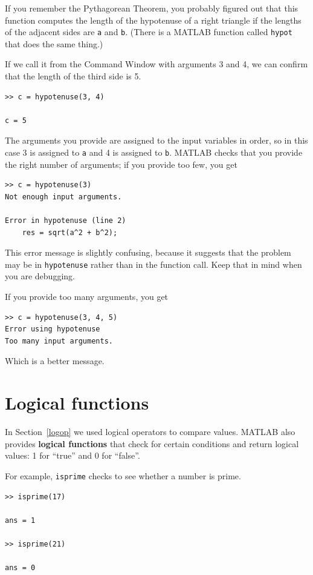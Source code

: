 \documentclass{book}
\begin{document}
If you remember the Pythagorean Theorem, you probably figured out
that this function computes the length of the hypotenuse of a right
triangle if the lengths of the adjacent sides are {\tt a}
and {\tt b}.  (There is a MATLAB function called {\tt hypot} that does
the same thing.)

If we call it from the Command Window with arguments 3 and 4, we can
confirm that the length of the third side is 5.

\begin{verbatim}
>> c = hypotenuse(3, 4)

c = 5
\end{verbatim}

The arguments you provide are assigned to the input variables in
order, so in this case 3 is assigned to {\tt a} and 4 is assigned to
{\tt b}.  MATLAB checks that you provide the right number of arguments;
if you provide too few, you get

\begin{verbatim}
>> c = hypotenuse(3)
Not enough input arguments.

Error in hypotenuse (line 2)
    res = sqrt(a^2 + b^2);
\end{verbatim}

This error message is slightly confusing, because it suggests that
the problem may be in {\tt hypotenuse} rather than in the function call.
Keep that in mind when you are debugging.

If you provide too many arguments, you get

\begin{verbatim}
>> c = hypotenuse(3, 4, 5)
Error using hypotenuse
Too many input arguments.
\end{verbatim}

Which is a better message.


\section{Logical functions}

In Section~\ref{logop} we used logical operators to compare values.
MATLAB also provides {\bf logical functions} that check for certain
conditions and return logical values: 1 for ``true'' and 0 for ``false''.

For example, {\tt isprime} checks to see whether a number is prime.

\begin{verbatim}
>> isprime(17)

ans = 1

>> isprime(21)

ans = 0
\end{verbatim}
\end{document}

